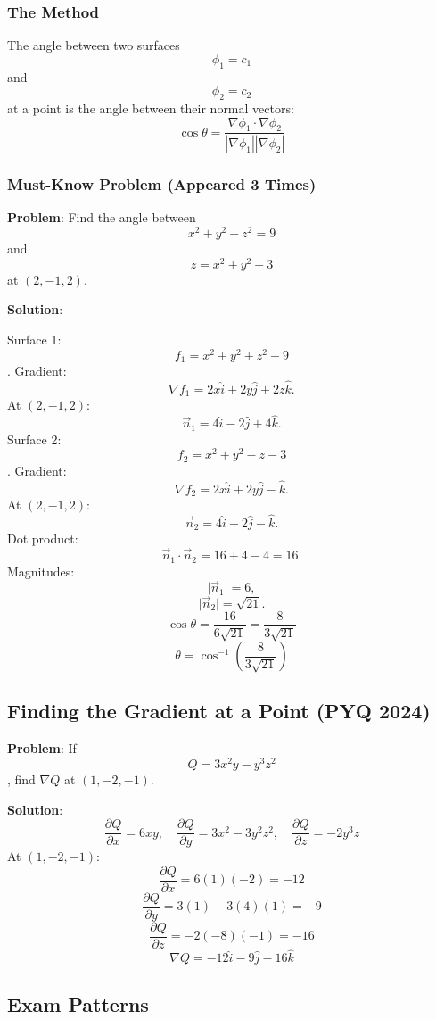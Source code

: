 \documentclass[
]{article}
\begin{document}
\subsubsection{The Method}\label{the-method}

The angle between two surfaces
\[
\phi_1 = c_1
\]
and
\[
\phi_2 = c_2
\]
at a point is the angle between their normal vectors:
\[
\cos\theta = \frac{\nabla\phi_1 \cdot \nabla\phi_2}{|\nabla\phi_1||\nabla\phi_2|}
\]
\subsubsection{Must-Know Problem (Appeared 3
Times)}\label{must-know-problem-appeared-3-times}

\textbf{Problem}: Find the angle between
\[
x^2 + y^2 + z^2 = 9
\]
and
\[
z = x^2 + y^2 - 3
\]
at \((2, -1, 2)\).

\textbf{Solution}:

Surface 1:
\[
f_1 = x^2 + y^2 + z^2 - 9
\]
. Gradient:
\[
\nabla f_1 = 2x\hat{i} + 2y\hat{j} + 2z\hat{k}.
\]
At \((2, -1, 2)\):
\[
\vec{n}_1 = 4\hat{i} - 2\hat{j} + 4\hat{k}.
\]
Surface 2:
\[
f_2 = x^2 + y^2 - z - 3
\]
. Gradient:
\[
\nabla f_2 = 2x\hat{i} + 2y\hat{j} - \hat{k}.
\]
At \((2, -1, 2)\):
\[
\vec{n}_2 = 4\hat{i} - 2\hat{j} - \hat{k}.
\]
Dot product:
\[
\vec{n}_1 \cdot \vec{n}_2 = 16 + 4 - 4 = 16.
\]
Magnitudes:
\[
\lvert \vec{n}_1 \rvert = 6,
\]
\[
\lvert \vec{n}_2 \rvert = \sqrt{21}.
\]
\[
\cos\theta = \frac{16}{6\sqrt{21}} = \frac{8}{3\sqrt{21}}
\]
\[
\theta = \cos^{-1}\left(\frac{8}{3\sqrt{21}}\right)
\]

\subsection{Finding the Gradient at a Point (PYQ
2024)}\label{finding-the-gradient-at-a-point-pyq-2024}

\textbf{Problem}: If
\[
Q = 3x^2y - y^3z^2
\]
, find \(\nabla Q\) at \((1, -2, -1)\).

\textbf{Solution}:
\[
\frac{\partial Q}{\partial x} = 6xy, \quad \frac{\partial Q}{\partial y} = 3x^2 - 3y^2z^2, \quad \frac{\partial Q}{\partial z} = -2y^3z
\]
At \((1, -2, -1)\):
\[
\frac{\partial Q}{\partial x} = 6(1)(-2) = -12
\]
\[
\frac{\partial Q}{\partial y} = 3(1) - 3(4)(1) = -9
\]
\[
\frac{\partial Q}{\partial z} = -2(-8)(-1) = -16
\]
\[
\nabla Q = -12\hat{i} - 9\hat{j} - 16\hat{k}
\]

\subsection{Exam Patterns}\label{exam-patterns-6}
\end{document}
